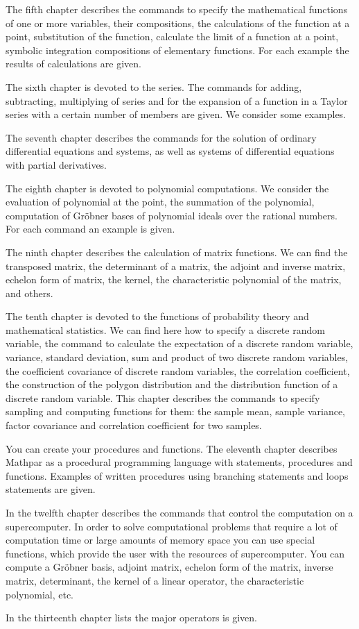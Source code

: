 The fifth chapter describes the commands to specify the mathematical functions of one or more variables, their compositions, the calculations of the function at a point, substitution of the function, calculate the limit of a function at a point, symbolic integration compositions of elementary functions.   For each example the results of calculations are given.

The sixth chapter is devoted to the series. The commands for adding, subtracting, multiplying of series and for the expansion of a function in a Taylor series with a certain number of members are given. We consider some examples.

The seventh chapter describes the commands for the solution of ordinary differential equations and systems, as well as systems of differential equations with partial derivatives.

The eighth chapter is devoted to polynomial computations. We consider the evaluation of polynomial at the point, the summation of the polynomial, computation of Gröbner bases of polynomial ideals over the rational numbers. For each command an example is given.

The ninth chapter describes the calculation of matrix functions. We can find the transposed matrix, the determinant of a matrix, the adjoint and inverse matrix, echelon form of matrix, the kernel, the characteristic polynomial of the matrix, and others.

The tenth chapter is devoted to the functions of probability theory and mathematical statistics. We can find here how to specify a discrete random variable, the command to calculate the expectation of a discrete random variable, variance, standard deviation, sum and product of two discrete random variables, the coefficient covariance of discrete random variables, the correlation coefficient, the construction of the polygon distribution and the distribution function of a discrete random variable. This chapter describes the commands to specify sampling and computing functions for them: the sample mean, sample variance, factor covariance and correlation coefficient for two samples.

You can create your procedures and functions. The eleventh chapter describes Mathpar as a procedural programming language with statements, procedures and functions. Examples of written procedures using branching statements and loops statements are given.

In the twelfth chapter describes the commands that control the computation on a supercomputer.
In order to solve computational problems that require a lot of computation time or large amounts of memory space you can use special functions, which provide the user with the resources of supercomputer.
You can compute a Gröbner basis, adjoint matrix, echelon form of the matrix, inverse matrix, determinant, the kernel of a linear operator, the characteristic polynomial, etc.

In the thirteenth chapter lists the major operators is given.
